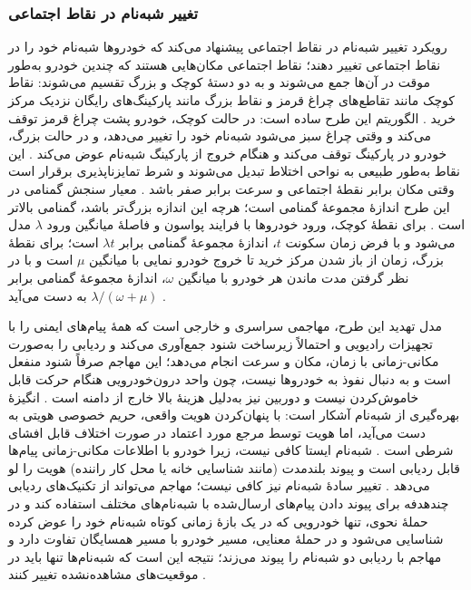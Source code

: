 \documentclass[12pt,a4paper]{article}
\begin{document}
\subsubsection{تغییر شبه‌نام در نقاط اجتماعی }

رویکرد تغییر شبه‌نام در نقاط اجتماعی  پیشنهاد می‌کند که خودرو‌ها شبه‌نام خود را در نقاط اجتماعی تغییر دهند؛ نقاط اجتماعی مکان‌هایی هستند که چندین خودرو به‌طور موقت در آن‌ها جمع می‌شوند و به دو دستهٔ کوچک و بزرگ تقسیم می‌شوند: نقاط کوچک مانند تقاطع‌های چراغ قرمز و نقاط بزرگ مانند پارکینگ‌های رایگان نزدیک مرکز خرید \cite{luPseudonymChangingSocial2012}. الگوریتم این طرح ساده است: در حالت کوچک، خودرو پشت چراغ قرمز توقف می‌کند و وقتی چراغ سبز می‌شود شبه‌نام خود را تغییر می‌دهد، و در حالت بزرگ، خودرو در پارکینگ توقف می‌کند و هنگام خروج از پارکینگ شبه‌نام عوض می‌کند \cite{luPseudonymChangingSocial2012}. این نقاط به‌طور طبیعی به نواحی اختلاط تبدیل می‌شوند و شرط تمایزناپذیری برقرار است وقتی مکان برابر نقطهٔ اجتماعی و سرعت برابر صفر باشد \cite{luPseudonymChangingSocial2012}. معیار سنجش گمنامی در این طرح اندازهٔ مجموعهٔ گمنامی است؛ هرچه این اندازه بزرگ‌تر باشد، گمنامی بالاتر است \cite{luPseudonymChangingSocial2012}. برای نقطهٔ کوچک، ورود خودرو‌ها با فرایند پواسون و فاصلهٔ میانگین ورود $\lambda$ مدل می‌شود و با فرض زمان سکونت $t$، اندازهٔ مجموعهٔ گمنامی برابر $\lambda t$ است؛ برای نقطهٔ بزرگ، زمان از باز شدن مرکز خرید تا خروج خودرو نمایی با میانگین $\mu$ است و با در نظر گرفتن مدت ماندن هر خودرو با میانگین $\omega$، اندازهٔ مجموعهٔ گمنامی برابر $\lambda/(\omega+\mu)$ به دست می‌آید \cite{luPseudonymChangingSocial2012}.

مدل تهدید این طرح، مهاجمی سراسری و خارجی است که همهٔ پیام‌های ایمنی را با تجهیزات رادیویی و احتمالاً زیرساخت شنود جمع‌آوری می‌کند و ردیابی را به‌صورت مکانی-زمانی با زمان، مکان و سرعت انجام می‌دهد؛ این مهاجم صرفاً شنود منفعل است و به دنبال نفوذ به خودرو‌ها نیست، چون واحد درون‌خودرویی هنگام حرکت قابل خاموش‌کردن نیست و دوربین نیز به‌دلیل هزینهٔ بالا خارج از دامنه است \cite{luPseudonymChangingSocial2012}. انگیزهٔ بهره‌گیری از شبه‌نام آشکار است: با پنهان‌کردن هویت واقعی، حریم خصوصی هویتی به دست می‌آید، اما هویت توسط مرجع مورد اعتماد در صورت اختلاف قابل افشای شرطی است \cite{luPseudonymChangingSocial2012}. شبه‌نام ایستا کافی نیست، زیرا خودرو با اطلاعات مکانی-زمانی پیام‌ها قابل ردیابی است و پیوند بلندمدت (مانند شناسایی خانه یا محل کار راننده) هویت را لو می‌دهد \cite{luPseudonymChangingSocial2012}. تغییر سادهٔ شبه‌نام نیز کافی نیست؛ مهاجم می‌تواند از تکنیک‌های ردیابی چندهدفه برای پیوند دادن پیام‌های ارسال‌شده با شبه‌نام‌های مختلف استفاده کند و در حملهٔ نحوی، تنها خودرویی که در یک بازهٔ زمانی کوتاه شبه‌نام خود را عوض کرده شناسایی می‌شود و در حملهٔ معنایی، مسیر خودرو با مسیر همسایگان تفاوت دارد و مهاجم با ردیابی دو شبه‌نام را پیوند می‌زند؛ نتیجه این است که شبه‌نام‌ها تنها باید در موقعیت‌های مشاهده‌نشده تغییر کنند \cite{luPseudonymChangingSocial2012}.
\end{document}

